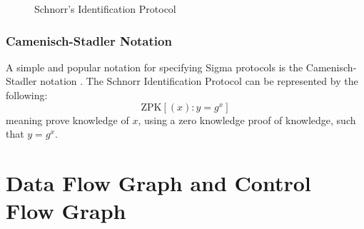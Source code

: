 \begin{figure}[h]
  \centering
  \caption{Schnorr's Identification Protocol}
  \label{fig:schnorr_steps}
\end{figure}

\subsubsection{Camenisch-Stadler Notation}
\label{subsubsec:camenisch_stadler}

A simple and popular notation for specifying Sigma protocols is the
Camenisch-Stadler notation \cite{camenisch_stadler}. The Schnorr
Identification Protocol can be represented by the following:
\[
  \textrm{ZPK}\left[ (x): y = g^x \right]
\]
meaning prove knowledge of $x$, using a zero knowledge proof of
knowledge, such that $y=g^x$.

\filbreak

\section{Data Flow Graph and Control Flow Graph}

